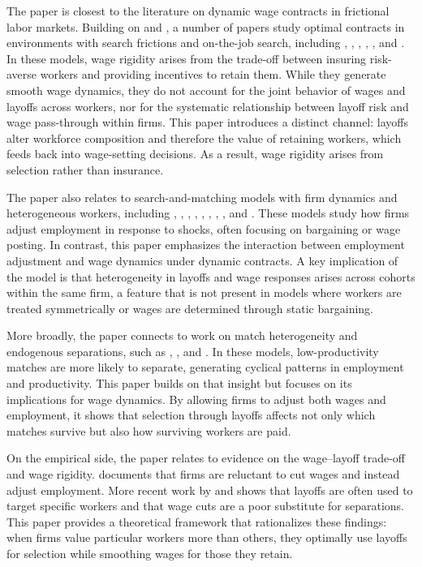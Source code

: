 The paper is closest to the literature on dynamic wage contracts in frictional labor markets. Building on \textcite{holmstrom1982} and \textcite{thomas1988}, a number of papers study optimal contracts in environments with search frictions and on-the-job search, including \textcite{burdett2003}, \textcite{menzio2011}, \textcite{balke2022}, \textcite{souchier2022}, \textcite{cedomir2024}, and \textcite{elsby2024}. In these models, wage rigidity arises from the trade-off between insuring risk-averse workers and providing incentives to retain them. While they generate smooth wage dynamics, they do not account for the joint behavior of wages and layoffs across workers, nor for the systematic relationship between layoff risk and wage pass-through within firms. This paper introduces a distinct channel: layoffs alter workforce composition and therefore the value of retaining workers, which feeds back into wage-setting decisions. As a result, wage rigidity arises from selection rather than insurance.

The paper also relates to search-and-matching models with firm dynamics and heterogeneous workers, including \textcite{acemoglu2014}, \textcite{elsby2013}, \textcite{kaas2015}, \textcite{schaal2017}, \textcite{gulyas2020}, \textcite{bilal2022}, \textcite{elsby2022}, \textcite{mccrary2022}, and \textcite{rudanko2023}. These models study how firms adjust employment in response to shocks, often focusing on bargaining or wage posting. In contrast, this paper emphasizes the interaction between employment adjustment and wage dynamics under dynamic contracts. A key implication of the model is that heterogeneity in layoffs and wage responses arises across cohorts within the same firm, a feature that is not present in models where workers are treated symmetrically or wages are determined through static bargaining.

More broadly, the paper connects to work on match heterogeneity and endogenous separations, such as \textcite{berger2011}, \textcite{menzio2011}, and \textcite{gregory2021}. In these models, low-productivity matches are more likely to separate, generating cyclical patterns in employment and productivity. This paper builds on that insight but focuses on its implications for wage dynamics. By allowing firms to adjust both wages and employment, it shows that selection through layoffs affects not only which matches survive but also how surviving workers are paid.

On the empirical side, the paper relates to evidence on the wage–layoff trade-off and wage rigidity. \textcite{bewley1999} documents that firms are reluctant to cut wages and instead adjust employment. More recent work by \textcite{bertheau2025} and \textcite{davis2025} shows that layoffs are often used to target specific workers and that wage cuts are a poor substitute for separations. This paper provides a theoretical framework that rationalizes these findings: when firms value particular workers more than others, they optimally use layoffs for selection while smoothing wages for those they retain.

